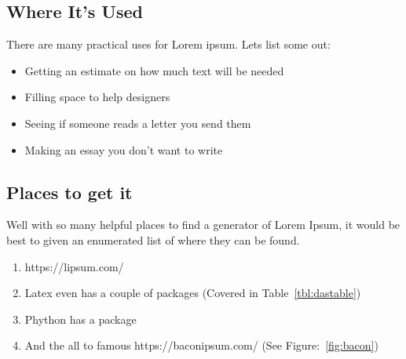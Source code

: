 \documentclass[11pt]{article}
\begin{document}
\subsection{Where It's Used}
There are many practical uses for Lorem ipsum.
Lets list some out:
\begin{itemize}
\item Getting an estimate on how much text will be needed
\item Filling space to help designers
\item Seeing if someone reads a letter you send them
\item Making an essay you don't want to write
\end{itemize}

\subsection{Places to get it}
Well with so many helpful places to find a generator of Lorem Ipsum, it would be best to given an enumerated list of where they can be found.
\begin{enumerate}
\item https://lipsum.com/
\item Latex even has a couple of packages (Covered in Table~\ref{tbl:dastable})
\item Phython has a package
\item And the all to famous https://baconipsum.com/ (See Figure:~\ref{fig:bacon})
\end{enumerate}
\end{document}
